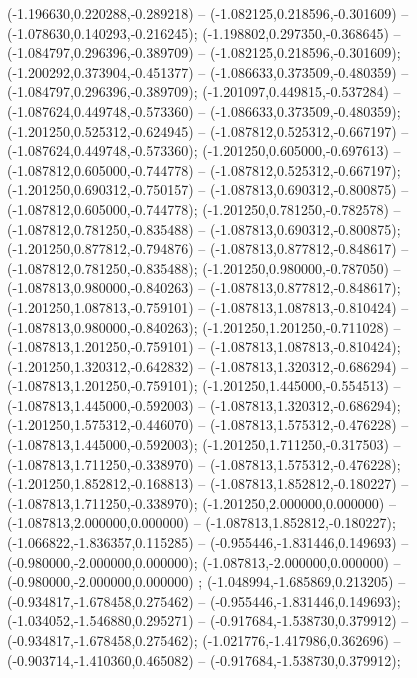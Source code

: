  (-1.196630,0.220288,-0.289218) -- (-1.082125,0.218596,-0.301609) -- (-1.078630,0.140293,-0.216245);
 (-1.198802,0.297350,-0.368645) -- (-1.084797,0.296396,-0.389709) -- (-1.082125,0.218596,-0.301609);
 (-1.200292,0.373904,-0.451377) -- (-1.086633,0.373509,-0.480359) -- (-1.084797,0.296396,-0.389709);
 (-1.201097,0.449815,-0.537284) -- (-1.087624,0.449748,-0.573360) -- (-1.086633,0.373509,-0.480359);
 (-1.201250,0.525312,-0.624945) -- (-1.087812,0.525312,-0.667197) -- (-1.087624,0.449748,-0.573360);
 (-1.201250,0.605000,-0.697613) -- (-1.087812,0.605000,-0.744778) -- (-1.087812,0.525312,-0.667197);
 (-1.201250,0.690312,-0.750157) -- (-1.087813,0.690312,-0.800875) -- (-1.087812,0.605000,-0.744778);
 (-1.201250,0.781250,-0.782578) -- (-1.087812,0.781250,-0.835488) -- (-1.087813,0.690312,-0.800875);
 (-1.201250,0.877812,-0.794876) -- (-1.087813,0.877812,-0.848617) -- (-1.087812,0.781250,-0.835488);
 (-1.201250,0.980000,-0.787050) -- (-1.087813,0.980000,-0.840263) -- (-1.087813,0.877812,-0.848617);
 (-1.201250,1.087813,-0.759101) -- (-1.087813,1.087813,-0.810424) -- (-1.087813,0.980000,-0.840263);
 (-1.201250,1.201250,-0.711028) -- (-1.087813,1.201250,-0.759101) -- (-1.087813,1.087813,-0.810424);
 (-1.201250,1.320312,-0.642832) -- (-1.087813,1.320312,-0.686294) -- (-1.087813,1.201250,-0.759101);
 (-1.201250,1.445000,-0.554513) -- (-1.087813,1.445000,-0.592003) -- (-1.087813,1.320312,-0.686294);
 (-1.201250,1.575312,-0.446070) -- (-1.087813,1.575312,-0.476228) -- (-1.087813,1.445000,-0.592003);
 (-1.201250,1.711250,-0.317503) -- (-1.087813,1.711250,-0.338970) -- (-1.087813,1.575312,-0.476228);
 (-1.201250,1.852812,-0.168813) -- (-1.087813,1.852812,-0.180227) -- (-1.087813,1.711250,-0.338970);
 (-1.201250,2.000000,0.000000) -- (-1.087813,2.000000,0.000000) -- (-1.087813,1.852812,-0.180227);
 (-1.066822,-1.836357,0.115285) -- (-0.955446,-1.831446,0.149693) -- (-0.980000,-2.000000,0.000000);
 (-1.087813,-2.000000,0.000000) -- (-0.980000,-2.000000,0.000000) ;
 (-1.048994,-1.685869,0.213205) -- (-0.934817,-1.678458,0.275462) -- (-0.955446,-1.831446,0.149693);
 (-1.034052,-1.546880,0.295271) -- (-0.917684,-1.538730,0.379912) -- (-0.934817,-1.678458,0.275462);
 (-1.021776,-1.417986,0.362696) -- (-0.903714,-1.410360,0.465082) -- (-0.917684,-1.538730,0.379912);

